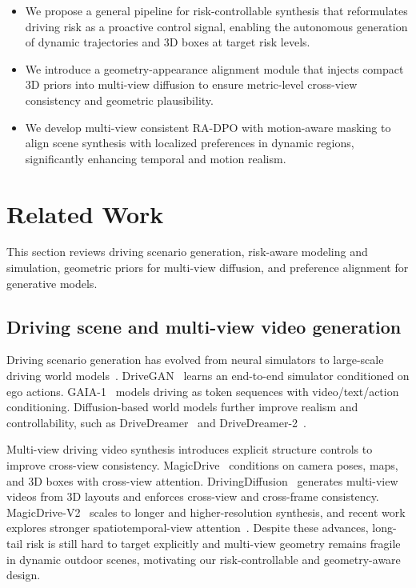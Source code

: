 \documentclass{article}
\begin{document}
{\setlength{\leftmargini}{12pt}
\begin{itemize}
\item We propose a general pipeline for risk-controllable synthesis that reformulates driving risk as a proactive control signal, enabling the autonomous generation of dynamic trajectories and 3D boxes at target risk levels.
\item We introduce a geometry-appearance alignment module that injects compact 3D priors into multi-view diffusion to ensure metric-level cross-view consistency and geometric plausibility.
\item We develop multi-view consistent RA-DPO with motion-aware masking to align scene synthesis with localized preferences in dynamic regions, significantly enhancing temporal and motion realism.
\end{itemize}
}

\section{Related Work}
\label{sec:related_work}

This section reviews driving scenario generation, risk-aware modeling and simulation, geometric priors for multi-view diffusion, and preference alignment for generative models.

\subsection{Driving scene and multi-view video generation}

Driving scenario generation has evolved from neural simulators to large-scale driving world models~\cite{lin2025big}. DriveGAN~\cite{kim2021drivegan} learns an end-to-end simulator conditioned on ego actions. GAIA-1~\cite{hu2023gaia} models driving as token sequences with video/text/action conditioning. Diffusion-based world models further improve realism and controllability, such as DriveDreamer~\cite{wang2024drivedreamer} and DriveDreamer-2~\cite{zhao2025drivedreamer}.

Multi-view driving video synthesis introduces explicit structure controls to improve cross-view consistency. MagicDrive~\cite{gao2023magicdrive} conditions on camera poses, maps, and 3D boxes with cross-view attention. DrivingDiffusion~\cite{li2024drivingdiffusion} generates multi-view videos from 3D layouts and enforces cross-view and cross-frame consistency. MagicDrive-V2~\cite{gao2025magicdrive} scales to longer and higher-resolution synthesis, and recent work explores stronger spatiotemporal-view attention~\cite{lu2024seeing}. Despite these advances, long-tail risk is still hard to target explicitly and multi-view geometry remains fragile in dynamic outdoor scenes, motivating our risk-controllable and geometry-aware design.
\end{document}
